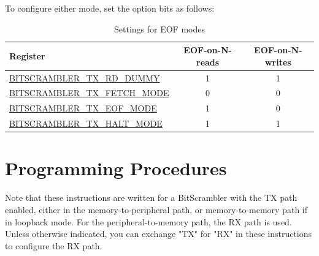 \documentclass[main\_\_EN.tex]{subfiles}
\begin{document}
To configure either mode, set the option bits as follows:

\begin{table}[H]
\centering
\caption{Settings for EOF modes}
\label{tab:bitscrm-settings-for-eof-modes}
\begin{tabular}{|l|c|c|}
\hline\rowcolor{lightgray}
Register & EOF-on-N-reads & EOF-on-N-writes \\
\hline
\hyperref[fielddesc:BITSCRAMBLERTXRDDUMMY]{BITSCRAMBLER\_TX\_RD\_DUMMY} & 1 & 1 \\ \hline
\hyperref[fielddesc:BITSCRAMBLERTXFETCHMODE]{BITSCRAMBLER\_TX\_FETCH\_MODE} & 0 & 0 \\ \hline
\hyperref[fielddesc:BITSCRAMBLERTXEOFMODE]{BITSCRAMBLER\_TX\_EOF\_MODE} & 1 & 0 \\ \hline
\hyperref[fielddesc:BITSCRAMBLERTXHALTMODE]{BITSCRAMBLER\_TX\_HALT\_MODE} & 1 & 1 \\\hline
\end{tabular}
\end{table}


\section{Programming Procedures}
\label{sec:bitscrm-prog-procedures}

Note that these instructions are written for a BitScrambler with the TX path enabled, either in the memory-to-peripheral path, or memory-to-memory path if in loopback mode. For the peripheral-to-memory path, the RX path is used. Unless otherwise indicated, you can exchange "TX" for "RX" in these instructions to configure the RX path.
\end{document}
